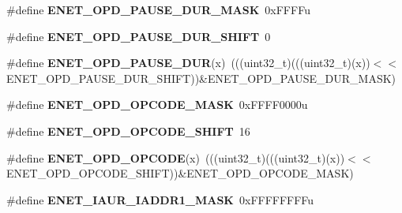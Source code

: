 \begin{DoxyCompactItemize}
\item 
\#define {\bfseries E\+N\+E\+T\+\_\+\+O\+P\+D\+\_\+\+P\+A\+U\+S\+E\+\_\+\+D\+U\+R\+\_\+\+M\+A\+SK}~0x\+F\+F\+F\+Fu\hypertarget{group__ENET__Register__Masks_ga1c63364c148916da71bb917ea8d96adf}{}\label{group__ENET__Register__Masks_ga1c63364c148916da71bb917ea8d96adf}

\item 
\#define {\bfseries E\+N\+E\+T\+\_\+\+O\+P\+D\+\_\+\+P\+A\+U\+S\+E\+\_\+\+D\+U\+R\+\_\+\+S\+H\+I\+FT}~0\hypertarget{group__ENET__Register__Masks_ga0cd72f21fa65e5ce01260fdf303bc9e2}{}\label{group__ENET__Register__Masks_ga0cd72f21fa65e5ce01260fdf303bc9e2}

\item 
\#define {\bfseries E\+N\+E\+T\+\_\+\+O\+P\+D\+\_\+\+P\+A\+U\+S\+E\+\_\+\+D\+UR}(x)~(((uint32\+\_\+t)(((uint32\+\_\+t)(x))$<$$<$E\+N\+E\+T\+\_\+\+O\+P\+D\+\_\+\+P\+A\+U\+S\+E\+\_\+\+D\+U\+R\+\_\+\+S\+H\+I\+FT))\&E\+N\+E\+T\+\_\+\+O\+P\+D\+\_\+\+P\+A\+U\+S\+E\+\_\+\+D\+U\+R\+\_\+\+M\+A\+SK)\hypertarget{group__ENET__Register__Masks_ga541dcbba44e5eff5ae1d0cb74b5a55af}{}\label{group__ENET__Register__Masks_ga541dcbba44e5eff5ae1d0cb74b5a55af}

\item 
\#define {\bfseries E\+N\+E\+T\+\_\+\+O\+P\+D\+\_\+\+O\+P\+C\+O\+D\+E\+\_\+\+M\+A\+SK}~0x\+F\+F\+F\+F0000u\hypertarget{group__ENET__Register__Masks_ga91f8d538d8541612f56f3a8e42d99c92}{}\label{group__ENET__Register__Masks_ga91f8d538d8541612f56f3a8e42d99c92}

\item 
\#define {\bfseries E\+N\+E\+T\+\_\+\+O\+P\+D\+\_\+\+O\+P\+C\+O\+D\+E\+\_\+\+S\+H\+I\+FT}~16\hypertarget{group__ENET__Register__Masks_ga775f746ec6513ddb5be567b51b1b8c1b}{}\label{group__ENET__Register__Masks_ga775f746ec6513ddb5be567b51b1b8c1b}

\item 
\#define {\bfseries E\+N\+E\+T\+\_\+\+O\+P\+D\+\_\+\+O\+P\+C\+O\+DE}(x)~(((uint32\+\_\+t)(((uint32\+\_\+t)(x))$<$$<$E\+N\+E\+T\+\_\+\+O\+P\+D\+\_\+\+O\+P\+C\+O\+D\+E\+\_\+\+S\+H\+I\+FT))\&E\+N\+E\+T\+\_\+\+O\+P\+D\+\_\+\+O\+P\+C\+O\+D\+E\+\_\+\+M\+A\+SK)\hypertarget{group__ENET__Register__Masks_gac6895ba9997a60b06b3a1a85e18259e7}{}\label{group__ENET__Register__Masks_gac6895ba9997a60b06b3a1a85e18259e7}

\item 
\#define {\bfseries E\+N\+E\+T\+\_\+\+I\+A\+U\+R\+\_\+\+I\+A\+D\+D\+R1\+\_\+\+M\+A\+SK}~0x\+F\+F\+F\+F\+F\+F\+F\+Fu\hypertarget{group__ENET__Register__Masks_ga2883158c5de2f27f29274ce0251b2f81}{}\label{group__ENET__Register__Masks_ga2883158c5de2f27f29274ce0251b2f81}


\end{DoxyCompactItemize}
